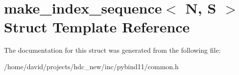 \hypertarget{structmake__index__sequence}{}\section{make\+\_\+index\+\_\+sequence$<$ N, S $>$ Struct Template Reference}
\label{structmake__index__sequence}


The documentation for this struct was generated from the following file\+:\begin{DoxyCompactItemize}
\item 
/home/david/projects/hdc\+\_\+new/inc/pybind11/common.\+h\end{DoxyCompactItemize}
